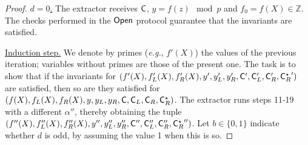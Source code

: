 \documentclass{article}
\theoremstyle{definition}
\begin{document}
\begin{proof}
\underline{$d = 0$.} The extractor receives $\mathsf{C}$, $y = f(z) \mod p$ and $f_0 = f(X) \in \mathbb{Z}$. The checks performed in the $\textsf{{Open}}$ protocol guarantee that the invariants are satisfied.

\underline{Induction step.} We denote by primes (\emph{e.g.}, $f'(X)$) the values of the previous iteration; variables without primes are those of the present one. The task is to show that if the invariants for $(f'(X), f_L'(X), f_R'(X), y', y_L', y_R', \mathsf{C}', \mathsf{C}_L', \mathsf{C}_R', {\mathsf{C}_R^{\star}}')$ are satisfied, then so are they satisfied for $(f(X), f_L(X), f_R(X), y, y_L, y_R, \mathsf{C}, \mathsf{C}_L, \mathsf{C}_R, \mathsf{C}_R^{\star})$. The extractor runs steps 11-19 with a different $\alpha''$, thereby obtaining the tuple $(f''(X), f_L''(X), f_R''(X), y'', y_L'', y_R'', \mathsf{C}'', \mathsf{C}_L'', \mathsf{C}_R'', {\mathsf{C}_R^{\star}}'')$. Let $b \in \{0,1\}$ indicate whether $d$ is odd, by assuming the value 1 when this is so.


\end{proof}
\end{document}
